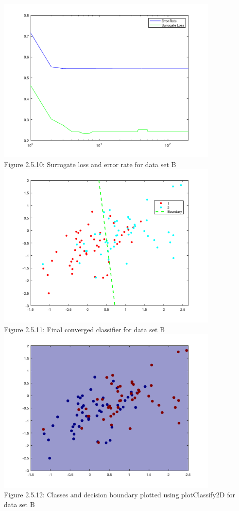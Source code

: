 \documentclass[]{scrreprt}   %
\begin{document}
\begin{center}
		\includegraphics[width=30em,keepaspectratio]{p5figure10.png}\\
	{Figure 2.5.10: Surrogate loss and error rate for data set B}
	\includegraphics[width=30em,keepaspectratio]{p5figure11.png}\\
	{Figure 2.5.11: Final converged classifier for data set B}
	\includegraphics[width=30em,keepaspectratio]{p5figure12.png}\\
	{Figure 2.5.12: Classes and decision boundary plotted using plotClassify2D for data set B}
\end{center} 
\end{document}

